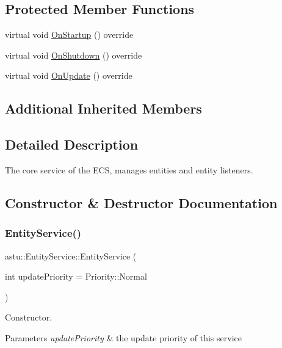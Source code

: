 \subsection*{Protected Member Functions}
\begin{DoxyCompactItemize}
\item 
virtual void \hyperlink{classastu_1_1EntityService_a293ff7c8b84837b08cdabe98ed8a23ea}{On\+Startup} () override
\item 
virtual void \hyperlink{classastu_1_1EntityService_ac998c4d02a90460a129c8f2e0586d728}{On\+Shutdown} () override
\item 
virtual void \hyperlink{classastu_1_1EntityService_a70831a8dc185652c2c9056c4e3cc10e0}{On\+Update} () override
\end{DoxyCompactItemize}
\subsection*{Additional Inherited Members}


\subsection{Detailed Description}
The core service of the E\+CS, manages entities and entity listeners. 

\subsection{Constructor \& Destructor Documentation}
\mbox{\label{classastu_1_1EntityService_a74fc8d1e8b7aadf0899142c248cb2211}} 
\subsubsection{\texorpdfstring{Entity\+Service()}{EntityService()}}
{\footnotesize\ttfamily astu\+::\+Entity\+Service\+::\+Entity\+Service (\begin{DoxyParamCaption}\item[{int}]{update\+Priority = {\ttfamily Priority\+:\+:Normal} }\end{DoxyParamCaption})}

Constructor.


\begin{DoxyParams}{Parameters}
{\em update\+Priority} & the update priority of this service \\
\hline
\end{DoxyParams}


